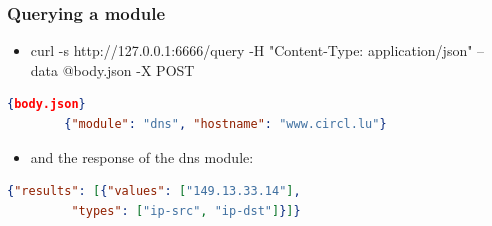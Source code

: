 
\begin{frame}[fragile]
        \frametitle{Querying a module}
        \begin{itemize}
                \item curl -s http://127.0.0.1:6666/query -H "Content-Type: application/json" --data @body.json -X POST
        \end{itemize}
        \begin{lstlisting}[language=json,firstnumber=1]{body.json}
        {"module": "dns", "hostname": "www.circl.lu"}
        \end{lstlisting}
        \begin{itemize}
                \item and the response of the dns module:
        \end{itemize}
        \begin{lstlisting}[language=json,firstnumber=1]
        {"results": [{"values": ["149.13.33.14"],
         "types": ["ip-src", "ip-dst"]}]}
        \end{lstlisting}
\end{frame}

